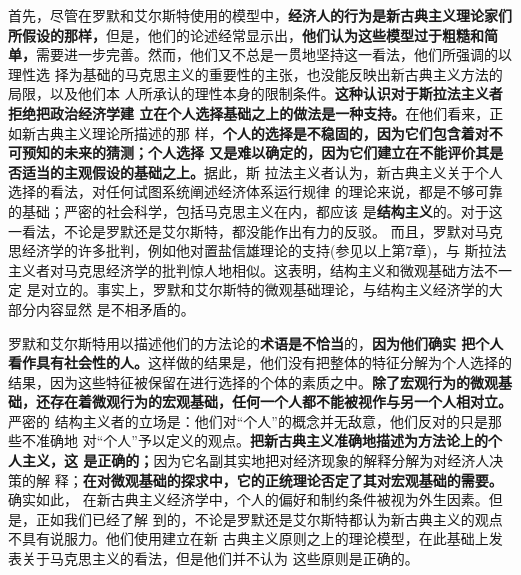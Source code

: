 首先，尽管在罗默和艾尔斯特使用的模型中，\textbf{经济人的行为是新古典主义理论家们
  所假设的那样，}但是，他们的论述经常显示出，\textbf{他们认为这些模型过于粗糙和简
  单，}需要进一步完善。然而，他们又不总是一贯地坚持这一看法，他们所强调的以理性选
择为基础的马克思主义的重要性的主张，也没能反映出新古典主义方法的局限，以及他们本
人所承认的理性本身的限制条件。\textbf{这种认识对于斯拉法主义者拒绝把政治经济学建
  立在个人选择基础之上的做法是一种支持。}在他们看来，正如新古典主义理论所描述的那
样，\textbf{个人的选择是不稳固的，因为它们包含着对不可预知的未来的猜测；个人选择
  又是难以确定的，因为它们建立在不能评价其是否适当的主观假设的基础之上。}据此，斯
拉法主义者认为，新古典主义关于个人选择的看法，对任何试图系统阐述经济体系运行规律
的理论来说，都是不够可靠的基础；严密的社会科学，包括马克思主义在内，都应该
是\textbf{结构主义}的。对于这一看法，不论是罗默还是艾尔斯特，都没能作出有力的反驳。
而且，罗默对马克思经济学的许多批判，例如他对置盐信雄理论的支持(参见以上第7章)，与
斯拉法主义者对马克思经济学的批判惊人地相似。这表明，结构主义和微观基础方法不一定
是对立的。事实上，罗默和艾尔斯特的微观基础理论，与结构主义经济学的大部分内容显然
是不相矛盾的。

罗默和艾尔斯特用以描述他们的方法论的\textbf{术语是不恰当}的，\textbf{因为他们确实
  把个人看作具有社会性的人。}这样做的结果是，他们没有把整体的特征分解为个人选择的
结果，因为这些特征被保留在进行选择的个体的素质之中。\textbf{除了宏观行为的微观基
  础，还存在着微观行为的宏观基础，任何一个人都不能被视作与另一个人相对立。}严密的
结构主义者的立场是：他们对“个人”的概念并无敌意，他们反对的只是那些不准确地
对“个人”予以定义的观点。\textbf{把新古典主义准确地描述为方法论上的个人主义，这
  是正确的；}因为它名副其实地把对经济现象的解释分解为对经济人决策的解
释；\textbf{在对微观基础的探求中，它的正统理论否定了其对宏观基础的需要。}确实如此，
在新古典主义经济学中，个人的偏好和制约条件被视为外生因素。但是，正如我们已经了解
到的，不论是罗默还是艾尔斯特都认为新古典主义的观点不具有说服力。他们使用建立在新
古典主义原则之上的理论模型，在此基础上发表关于马克思主义的看法，但是他们并不认为
这些原则是正确的。

